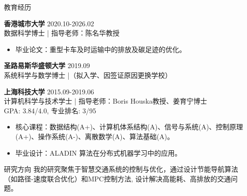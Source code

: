 \documentclass{resume} %
\newcommand{\trianglebullet}{$\mbox{\ensuremath{\rhd}}$}
\begin{document}




\begin{rSection}{教育经历}

    \textbf{香港城市大学}  \hfill {2020.10-2026.02} 
    \\ 数据科学博士 | 指导老师：陈名华教授
    \begin{itemize}
        \item 毕业论文：重型卡车及时运输中的排放及碳足迹的优化。
    \end{itemize}

    \textbf{圣路易斯华盛顿大学}  \hfill {2019.09}
    \\ 系统科学与数学博士 |（拟入学、因签证原因更换学校） 

    \textbf{上海科技大学}  \hfill {2015.09-2019.06} 
    \\ 计算机科学与技术学士 | 指导老师：Boris Houska教授、姜育宁博士
    \\ GPA: 3.84/4.0, 专业排名: 3/95
    \begin{itemize}
        \item 核心课程：数据结构(A+)、计算机体系结构(A)、信号与系统(A)、控制原理(A+)、操作系统(A-)、离散数学(A)、算法基础(A)。
        \item   毕业设计：ALADIN 算法在分布式机器学习中的应用。
    \end{itemize}



\end{rSection}

\begin{rSection}{研究方向}
    我的研究聚焦于智慧交通系统的控制与优化，通过设计节能导航算法（如路径-速度联合优化）和MPC控制方法, 设计解决高能耗、高排放的交通问题。
\end{rSection}
\end{document}
